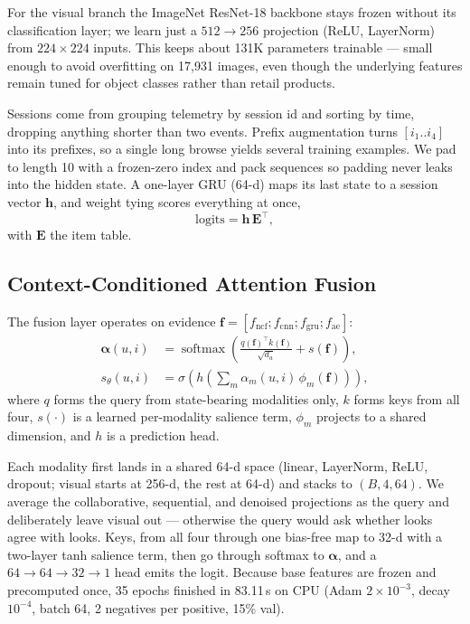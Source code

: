 \documentclass[conference]{IEEEtran}
\begin{document}
For the visual branch the ImageNet ResNet-18 backbone stays frozen without its
classification layer; we learn just a $512\!\to\!256$ projection (ReLU, LayerNorm)
from $224\times224$ inputs. This keeps about 131K parameters trainable --- small
enough to avoid overfitting on 17{,}931 images, even though the underlying features
remain tuned for object classes rather than retail products.

Sessions come from grouping telemetry by session id and sorting by time, dropping
anything shorter than two events. Prefix augmentation turns $[i_1..i_4]$ into its
prefixes, so a single long browse yields several training examples. We pad to length
10 with a frozen-zero index and pack sequences so padding never leaks into the hidden
state. A one-layer GRU (64-d) maps its last state to a session vector $\mathbf{h}$,
and weight tying scores everything at once,
\begin{equation}
\text{logits} = \mathbf{h}\,\mathbf{E}^{\top},
\label{eq:gru}
\end{equation}
with $\mathbf{E}$ the item table.

\subsection{Context-Conditioned Attention Fusion}
\label{sec:fusion}

The fusion layer operates on evidence
$\mathbf{f} = [f_{\mathrm{ncf}}; f_{\mathrm{cnn}}; f_{\mathrm{gru}}; f_{\mathrm{ae}}]$:
\begin{align}
\boldsymbol{\alpha}(u,i) &= \operatorname{softmax}\!\left(
  \tfrac{q(\mathbf{f})^{\top} k(\mathbf{f})}{\sqrt{d_a}} + s(\mathbf{f}) \right),
\label{eq:alpha} \\
s_\theta(u,i) &= \sigma\!\left( h\!\left( \sum_{m} \alpha_m(u,i)\, \phi_m(\mathbf{f}) \right) \right),
\label{eq:score}
\end{align}
where $q$ forms the query from state-bearing modalities only, $k$ forms keys from
all four, $s(\cdot)$ is a learned per-modality salience term, $\phi_m$ projects to a
shared dimension, and $h$ is a prediction head.

Each modality first lands in a shared 64-d space (linear, LayerNorm, ReLU, dropout;
visual starts at 256-d, the rest at 64-d) and stacks to $(B,4,64)$. We average the
collaborative, sequential, and denoised projections as the query and deliberately
leave visual out --- otherwise the query would ask whether looks agree with looks.
Keys, from all four through one bias-free map to 32-d with a two-layer tanh salience
term, then go through softmax to $\boldsymbol{\alpha}$, and a
$64\!\to\!64\!\to\!32\!\to\!1$ head emits the logit. Because base features are
frozen and precomputed once, 35 epochs finished in 83.11\,s on CPU (Adam
$2\!\times\!10^{-3}$, decay $10^{-4}$, batch 64, 2 negatives per positive, 15\% val).
\end{document}
